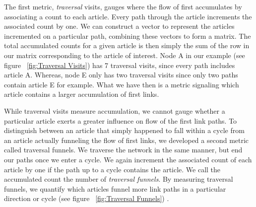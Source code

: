 \documentclass[pre,twocolumn,twoside,superscriptaddress,floatfix, aps, 10pt]{revtex4-1}
\begin{document}
The first metric, {\it traversal} visits, gauges where the flow of first accumulates by associating a count to each article. 
Every path through the article increments the associated count by one. We can construct a vector to represent the articles incremented on a particular path, combining these vectors to form a matrix. 
The total accumulated counts for a given article is then simply the sum of the row in our matrix corresponding to the article of interest. 
Node A in our example (see figure ~\ref{fig:Traversal Visits}) has 7 traversal visits, since every path includes article A. 
Whereas, node E only has two traversal visits since only two paths contain article E for example.
What we have then is a metric signaling which article contains a larger accumulation of first links.


While traversal visits measure accumulation, we cannot gauge whether a particular article exerts a greater influence on flow of the first link paths. 
To distinguish between an article that simply happened to fall within a cycle from an article actually funneling the flow of first links, we developed a second metric called traversal funnels. 
We traverse the network in the same manner, but end our paths once we enter a cycle. 
We again increment the associated count of each article by one if the path up to a cycle contains the article. 
We call the accumulated count the number of {\it traversal funnels}. By measuring traversal funnels, we quantify
which articles funnel more link paths in a particular direction or cycle 
(see figure ~\ref{fig:Traversal Funnels})
.
\end{document}
